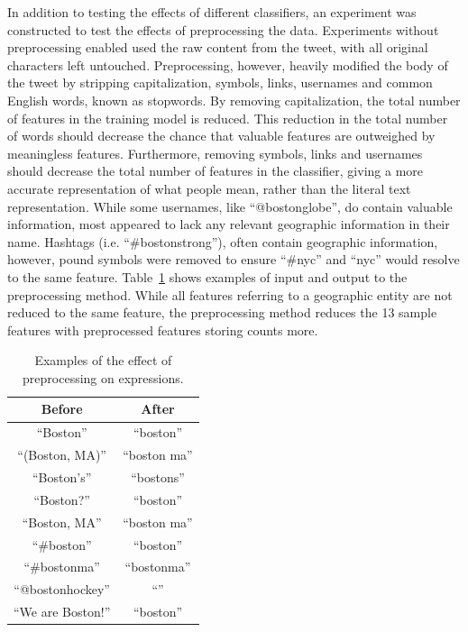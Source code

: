 \documentclass[midd]{thesis}
\begin{document}
In addition to testing the effects of different classifiers, an experiment was constructed to test the effects of preprocessing the data. Experiments without preprocessing enabled used the raw content from the tweet, with all original characters left untouched. Preprocessing, however, heavily modified the body of the tweet by stripping capitalization, symbols, links, usernames and common English words, known as stopwords. By removing capitalization, the total number of features in the training model is reduced. This reduction in the total number of words should decrease the chance that valuable features are outweighed by meaningless features. Furthermore, removing symbols, links and usernames should decrease the total number of features in the classifier, giving a more accurate representation of what people mean, rather than the literal text representation. While some usernames, like ``@bostonglobe'', do contain valuable information, most appeared to lack any relevant geographic information in their name. Hashtags (i.e. ``\#bostonstrong''), often contain geographic information, however, pound symbols were removed to ensure ``\#nyc'' and ``nyc'' would resolve to the same feature. Table~\ref{table:preprocessing} shows examples of input and output to the preprocessing method. While all features referring to a geographic entity are not reduced to the same feature, the preprocessing method reduces the 13 sample features with preprocessed features storing counts more.


\begin{table}
\label{table:preprocessing}
\caption{Examples of the effect of preprocessing on expressions.}
\centering 
  \begin{tabular}{| c | c |}
  \hline
  Before & After \\
  \hline
  ``Boston'' & ``boston'' \\
  ``(Boston, MA)'' & ``boston ma'' \\
  ``Boston's'' & ``bostons'' \\
  ``Boston?'' & ``boston'' \\
  ``Boston, MA'' & ``boston ma'' \\
  ``\#boston'' & ``boston'' \\
  ``\#bostonma'' & ``bostonma'' \\
  ``@bostonhockey'' & ``'' \\
  ``We are Boston!'' & ``boston'' \\
  \hline  
  \end{tabular}
\end{table}
\end{document}
